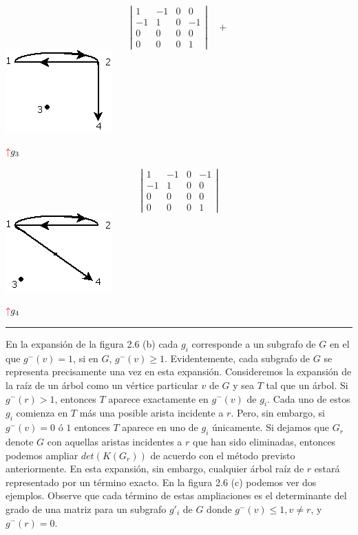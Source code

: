 \documentclass[10pt,a5paper]{book}
\begin{document}
\hspace*{-.7in}\vspace*{.3in}\parbox{6cm}
{
  \[
  \left | \begin{array}{cccc}
      1 & -1 & 0 & 0 \\
      -1 & 1 & 0 & -1 \\
      0 & 0 & 0 & 0 \\
      0 & 0 & 0 & 1 
      \end{array}
    \right | \quad + \]
    \hspace*{.4in}\includegraphics[scale=.65]{Fig2_6_c5.png}
    \begin{center} $\textcolor{rojo}{\uparrow} g_3$ \end{center}
}
\parbox{1cm}
{
  \[
  \left | \begin{array}{cccc}
      1 & -1 & 0 & -1 \\
      -1 & 1 & 0 & 0 \\
      0 & 0 & 0 & 0 \\
      0 & 0 & 0 & 1 
      \end{array}
    \right | \]
    \hspace*{.2in}\includegraphics[scale=.65]{Fig2_6_c6.png}
    \begin{center} $\textcolor{rojo}{\uparrow} g_4$ \end{center}
}\hrule
\hfill
\nopagebreak
En la expansión de la figura 2.6 (b) cada $g_i$ corresponde a un subgrafo de $G$ en el que $g^-(v) = 1$, si en $G$, $g^-(v) \ge 1$. Evidentemente, cada subgrafo de $G$ se representa precisamente una vez en esta expansión. Consideremos la expansión de la raíz de un árbol como un vértice particular $v$ de $G$ y sea $T$ tal que un árbol. Si $g^-(r) > 1$, entonces $T$ aparece exactamente en $g^-(v)$ de $g_i$. Cada uno de estos $g_i$ comienza en $T$ más una posible arista incidente a $r$. Pero, sin embargo, si $g^-(v) = 0$ ó $1$ entonces $T$ aparece en uno de $g_i$ únicamente. Si dejamos que $G_r$ denote $G$ con aquellas aristas incidentes a $r$ que han sido eliminadas, entonces podemos ampliar $det(K(G_r))$ de acuerdo con el método previsto anteriormente. En esta expansión, sin embargo, cualquier árbol raíz de $r$ estará representado por un término exacto. En la figura 2.6 (c) podemos ver dos ejemplos. Observe que cada término de estas ampliaciones es el determinante del grado de una matriz para un subgrafo $g'_i$ de $G$ donde $g^-(v) \le 1, v \ne r$, y $g^-(r) = 0$.
\end{document}
